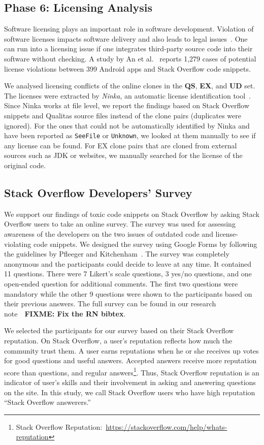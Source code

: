 \documentclass[10pt,journal,compsoc]{IEEEtran}
\newcommand\FIXME[1]{{\color{red}\textbf{FIXME: #1}}}
\begin{document}
\subsection{Phase 6: Licensing Analysis} Software licensing plays an important
role in software development. Violation of software licenses impacts software
delivery and also leads to legal issues~\cite{Sprigman2015}. 
One can run into a licensing issue if one integrates third-party source code
into their software without checking. A study by An et al.~\cite{An2017} reports
1,279 cases of potential license violations between 399 Android apps and Stack
Overflow code snippets.

We analysed licensing conflicts of the online clones in the \textbf{QS},
\textbf{EX}, and \textbf{UD} set. The licenses were extracted by \emph{Ninka},
an automatic license identification tool~\cite{German2010}. Since Ninka works at
file level, we report the findings based on Stack Overflow snippets and Qualitas
source files instead of the clone pairs (duplicates were ignored). For the ones
that could not be automatically identified by Ninka and have been reported as
{\small\texttt{SeeFile}} or {\small\texttt{Unknown}}, we looked at them manually
to see if any license can be found. For EX clone pairs that are cloned from
external sources such as JDK or websites, we manually searched for the license
of the original code.

\subsection{Stack Overflow Developers' Survey} We support our findings of
toxic code snippets on Stack Overflow by asking Stack
Overflow users to take an online survey. The survey was used for assessing awareness of
the developers on the two issues of outdated code and license-violating code
snippets. We designed the survey using Google Forms by following the guidelines by Pfleeger and
Kitchenham~\cite{Pfleeger2001,Kitchenham2002}. The survey was completely
anonymous and the participants could decide to leave at any time. It contained
11 questions. There were 7 Likert's scale questions, 3 yes/no questions, and one
open-ended question for additional comments. The first two questions were
mandatory while the other 9 questions were shown to the participants based on
their previous answers. The full survey can be found in our research note~\cite{Ragkhitwetsagul_RN2017}~\FIXME{Fix the RN bibtex}.

We selected the participants for our survey based on their Stack Overflow
reputation. On Stack Overflow, a user's reputation reflects how much the
community trust them. A user earns reputations when he or she receives up votes
for good questions and useful answers. Accepted answers receive more reputation
score than questions, and regular answers\footnote{Stack Overflow
Reputation:~\url{https://stackoverflow.com/help/whats-reputation}}. Thus, Stack
Overflow reputation is an indicator of user's skills and their involvement in
asking and answering questions on the site. In this study, we call Stack
Overflow users who have high reputation ``Stack Overflow answerers.''
\end{document}
